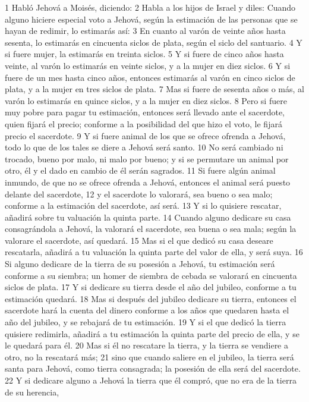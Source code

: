 1 Habló Jehová a Moisés, diciendo:
2 Habla a los hijos de Israel y diles: Cuando alguno hiciere especial voto a Jehová, según la estimación de las personas que se hayan de redimir, lo estimarás así:
3 En cuanto al varón de veinte años hasta sesenta, lo estimarás en cincuenta siclos de plata,  según el siclo del santuario.
4 Y si fuere mujer, la estimarás en treinta siclos.
5 Y si fuere de cinco años hasta veinte, al varón lo estimarás en veinte siclos,  y a la mujer en diez siclos.
6 Y si fuere de un mes hasta cinco años, entonces estimarás al varón en cinco siclos de plata,  y a la mujer en tres siclos de plata.
7 Mas si fuere de sesenta años o más, al varón lo estimarás en quince siclos,  y a la mujer en diez siclos.
8 Pero si fuere muy pobre para pagar tu estimación, entonces será llevado ante el sacerdote, quien fijará el precio; conforme a la posibilidad del que hizo el voto, le fijará precio el sacerdote.
9 Y si fuere animal de los que se ofrece ofrenda a Jehová, todo lo que de los tales se diere a Jehová será santo.
10 No será cambiado ni trocado, bueno por malo, ni malo por bueno; y si se permutare un animal por otro, él y el dado en cambio de él serán sagrados.
11 Si fuere algún animal inmundo, de que no se ofrece ofrenda a Jehová, entonces el animal será puesto delante del sacerdote,
12 y el sacerdote lo valorará, sea bueno o sea malo; conforme a la estimación del sacerdote, así será.
13 Y si lo quisiere rescatar, añadirá sobre tu valuación la quinta parte.
14 Cuando alguno dedicare su casa consagrándola a Jehová, la valorará el sacerdote, sea buena o sea mala; según la valorare el sacerdote, así quedará.
15 Mas si el que dedicó su casa deseare rescatarla, añadirá a tu valuación la quinta parte del valor de ella, y será suya.
16 Si alguno dedicare de la tierra de su posesión a Jehová, tu estimación será conforme a su siembra; un homer   de siembra de cebada se valorará en cincuenta siclos de plata.
17 Y si dedicare su tierra desde el año del jubileo, conforme a tu estimación quedará.
18 Mas si después del jubileo dedicare su tierra, entonces el sacerdote hará la cuenta del dinero conforme a los años que quedaren hasta el año del jubileo, y se rebajará de tu estimación.
19 Y si el que dedicó la tierra quisiere redimirla, añadirá a tu estimación la quinta parte del precio de ella, y se le quedará para él.
20 Mas si él no rescatare la tierra, y la tierra se vendiere a otro, no la rescatará más;
21 sino que cuando saliere en el jubileo, la tierra será santa para Jehová, como tierra consagrada; la posesión de ella será del sacerdote.
22 Y si dedicare alguno a Jehová la tierra que él compró, que no era de la tierra de su herencia,

